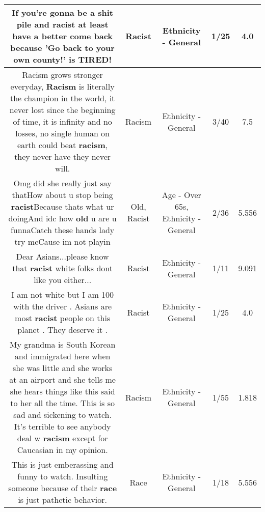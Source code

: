 \documentclass[11pt]{article}
\newlength\mylength
\begin{document}
\begin{center}
\begin{longtable}{|C{.65\mylength}|C{.30\mylength}|C{.12\mylength}|C{.12\mylength}|C{.12\mylength}|}
  \small If you're gonna be a shit pile and \textbf{racist} at least have a better come back because 'Go back to your own county!' is TIRED!\normalsize   & Racist & Ethnicity - General & 1/25 & 4.0 \\  \hline
  \small Racism grows stronger everyday, \textbf{Racism} is literally the champion in the world, it never lost since the beginning of time, it is infinity and no losses, no single human on earth could beat \textbf{racism}, they never have they never will.\normalsize   & Racism & Ethnicity - General & 3/40 & 7.5 \\  \hline
  \small Omg did she really just say thatHow about u stop being \textbf{racist}Because thats what ur doingAnd idc how \textbf{old} u are u funnaCatch these hands lady try meCause im not playin\normalsize   & Old, Racist & Age - Over 65s, Ethnicity - General & 2/36 & 5.556 \\  \hline
  \small Dear Asians...please know that \textbf{racist} white folks dont like you either...\normalsize   & Racist & Ethnicity - General & 1/11 & 9.091 \\  \hline
  \small I am not white but I am 100 with the driver . Asians are most \textbf{racist} people on this planet . They deserve it .\normalsize   & Racist & Ethnicity - General & 1/25 & 4.0 \\  \hline
  \small My grandma is South Korean and immigrated here when she was little and she works at an airport and she tells me she hears things like this said to her all the time. This is so sad and sickening to watch. It's terrible to see anybody deal w \textbf{racism} except for Caucasian in my opinion.\normalsize   & Racism & Ethnicity - General & 1/55 & 1.818 \\  \hline
  \small This is just emberassing and funny to watch. Insulting someone because of their \textbf{race} is just pathetic behavior.\normalsize   & Race & Ethnicity - General & 1/18 & 5.556 \\  \hline

\end{longtable}
\end{center}
\end{document}
